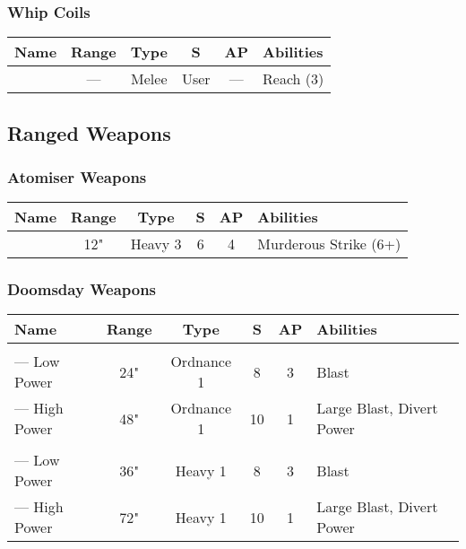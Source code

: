 \subsubsection{Whip Coils}
\label{Whip Coils}
\noindent
\begin{NiceTabular}{m{130 pt} *{4}{c} >{\raggedright\arraybackslash}p{240pt}}
	Name & Range & Type & S & AP & Abilities \\
	\hline
	 & — & Melee & User & — & Reach (3) \\
\end{NiceTabular}



\subsection{Ranged Weapons} \label{Ranged Weapons}


\subsubsection{Atomiser Weapons}

\label{Atomiser Beam Lance}
\noindent
\begin{NiceTabular}{m{130 pt} *{4}{c} >{\raggedright\arraybackslash}p{240pt}}
	Name & Range & Type & S & AP & Abilities \\
	\hline
	 & 12" & Heavy 3 & 6 & 4 & Murderous Strike (6+) \\
\end{NiceTabular}

\subsubsection{Doomsday Weapons} 
\label{Doomsday Cannon} \label{Doomsday Blaster}
\noindent
\begin{NiceTabular}{m{130 pt} *{4}{c} >{\raggedright\arraybackslash}p{240pt}}
	Name & Range & Type & S & AP & Abilities \\
	\hline
	 & & & & & \\
	— Low Power & 24" & Ordnance 1 & 8 & 3 & Blast \\
	— High Power & 48" & Ordnance 1 & 10 & 1 & Large Blast, Divert Power \\
	  & & & & & \\
	 — Low Power & 36" & Heavy 1 & 8 & 3 & Blast \\
	 — High Power & 72" & Heavy 1 & 10 & 1 & Large Blast, Divert Power \\
\end{NiceTabular}

